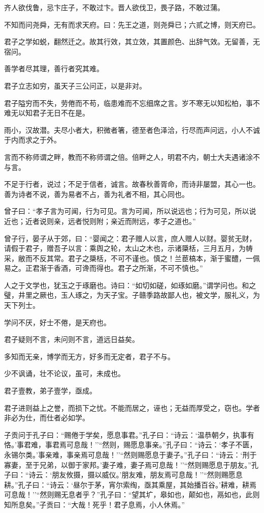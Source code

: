 \documentclass[]{article}
\begin{document}
齐人欲伐鲁，忌卞庄子，不敢过卞。晋人欲伐卫，畏子路，不敢过蒲。

不知而问尧舜，无有而求天府。曰：先王之道，则尧舜已；六贰之博，则天府已。

君子之学如蜕，翻然迁之。故其行效，其立效，其置颜色、出辞气效。无留善，无宿问。

善学者尽其理，善行者究其难。

君子立志如穷，虽天子三公问正，以是非对。

君子隘穷而不失，劳倦而不苟，临患难而不忘细席之言。岁不寒无以知松柏，事不难无以知君子无日不在是。

雨小，汉故潜。夫尽小者大，积微者箸，德至者色泽洽，行尽而声问远，小人不诚于内而求之于外。

言而不称师谓之畔，教而不称师谓之倍。倍畔之人，明君不内，朝士大夫遇诸涂不与言。

不足于行者，说过；不足于信者，诚言。故春秋善胥命，而诗非屡盟，其心一也。善为诗者不说，善为易者不占，善为礼者不相，其心同也。

曾子曰：``孝子言为可闻，行为可见。言为可闻，所以说远也；行为可见，所以说近也；近者说则亲，远者悦则附；亲近而附远，孝子之道也。''

曾子行，晏子从于郊，曰：``婴闻之：君子赠人以言，庶人赠人以财。婴贫无财，请假于君子，赠吾子以言：乘舆之轮，太山之木也，示诸檃栝，三月五月，为帱采，敝而不反其常。君子之檃栝，不可不谨也。慎之！兰茞槁本，渐于蜜醴，一佩易之。正君渐于香酒，可谗而得也。君子之所渐，不可不慎也。''

人之于文学也，犹玉之于琢磨也。诗曰：``如切如磋，如琢如磨。''谓学问也。和之璧，井里之厥也，玉人琢之，为天子宝。子赣季路故鄙人也，被文学，服礼义，为天下列士。

学问不厌，好士不倦，是天府也。

君子疑则不言，未问则不言，道远日益矣。

多知而无亲，博学而无方，好多而无定者，君子不与。

少不讽诵，壮不论议，虽可，未成也。

君子壹教，弟子壹学，亟成。

君子进则益上之誉，而损下之忧。不能而居之，诬也；无益而厚受之，窃也。学者非必为仕，而仕者必如学。

子贡问于孔子曰：``赐倦于学矣，愿息事君。''孔子曰：``诗云：`温恭朝夕，执事有恪。'事君难，事君焉可息哉！''``然则，赐愿息事亲。''孔子曰：``诗云：`孝子不匮，永锡尔类。'事亲难，事亲焉可息哉！''``然则赐愿息于妻子。''孔子曰：``诗云：`刑于寡妻，至于兄弟，以御于家邦。'妻子难，妻子焉可息哉！''``然则赐愿息于朋友。''孔子曰：``诗云：`朋友攸摄，摄以威仪。'朋友难，朋友焉可息哉！''``然则赐愿息耕。''孔子曰：``诗云：`昼尔于茅，宵尔索绹，亟其乘屋，其始播百谷。'耕难，耕焉可息哉！''``然则赐无息者乎？''孔子曰：``望其圹，皋如也，颠如也，鬲如也，此则知所息矣。''子贡曰：``大哉！死乎！君子息焉，小人休焉。''
\end{document}
